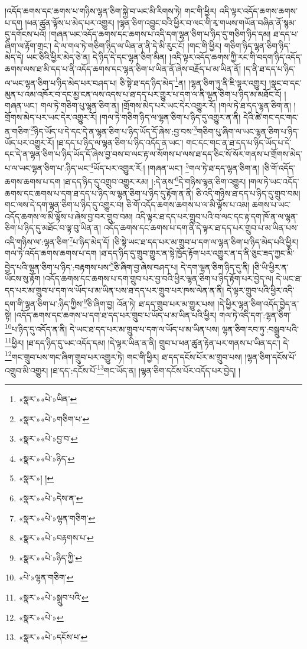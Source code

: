 །འདོད་ཆགས་དང་ཆགས་པ་གཉིས་ལྷན་ཅིག་སྐྱེ་བ་ཡང་མི་རིགས་ཏེ། གང་གི་ཕྱིར། འདི་ལྟར་འདོད་ཆགས་ཆགས་པ་དག །ཕན་ཚུན་ལྟོས་པ་མེད་པར་འགྱུར། །ལྷན་ཅིག་འབྱུང་བའི་ཕྱིར་བ་ལང་གི་རྭ་གཡས་གཡོན་བཞིན་ནོ་སྙམ་དུ་དགོངས་པའོ། །གཞན་ཡང་འདོད་ཆགས་དང་ཆགས་པ་འདི་དག་ལྷན་ཅིག་པ་ཉིད་དུ་གཅིག་ཉིད་དམ། ཐ་དད་པ་ཞིག་ལ་རྟོག་གྲང་། དེ་ལ་གལ་ཏེ་གཅིག་ཉིད་ལ་ཡིན་ན་ནི་དེ་མི་རུང་ངོ། །གང་གི་ཕྱིར། གཅིག་ཉིད་ལྷན་ཅིག་ཉིད་མེད་དེ། ཡང་ཅིའི་ཕྱིར་མེད་ཅེ་ན། དེ་ཉིད་དེ་དང་ལྷན་ཅིག་མིན། །འདི་ལྟར་འདོད་ཆགས་ཀྱི་རང་གི་བདག་ཉིད་འདོད་ཆགས་ལས་ཐ་མི་དད་པ་ནི་འདོད་ཆགས་དང་ལྷན་ཅིག་པ་ཡིན་ནོ་ཞེས་བརྗོད་པ་མ་ཡིན་ནོ། །ད་ནི་ཐ་དད་པ་ཉིད་ལ་ཡང་ལྷན་ཅིག་པ་ཉིད་མེད་པར་བཤད་པ། ཅི་སྟེ་ཐ་དད་ཉིད་མེད་\footnote{«སྣར་»«པེ་»ཡིན་}ན། །ལྷན་ཅིག་ཏུ་ནི་ཇི་ལྟར་འགྱུར། །སྣང་བ་དང་མུན་པ་འམ་འཁོར་བ་དང་མྱ་ངན་ལས་འདས་པ་ཐ་དད་པར་གྱུར་པ་དག་ལ་ནི་ལྷན་ཅིག་པ་ཉིད་མ་མཐོང་ངོ། །གཞན་ཡང་། གལ་ཏེ་གཅིག་པུ་ལྷན་ཅིག་ན། །གྲོགས་མེད་པར་ཡང་དེར་འགྱུར་རོ། །གལ་ཏེ་ཐ་དད་ལྷན་ཅིག་ན། །གྲོགས་མེད་པར་ཡང་དེར་འགྱུར་རོ། །གལ་ཏེ་གཅིག་ཉིད་ལ་ལྷན་ཅིག་པ་ཉིད་དུ་འགྱུར་ན་ནི། དེའི་ཚེ་གང་དང་གང་ན་གཅིག་\footnote{«སྣར་»«པེ་»གཅིག་པ་}ཉིད་ཡོད་པ་དེ་དང་དེ་ན་ལྷན་ཅིག་པ་ཉིད་ཡོད་དོ་ཞེས་:བྱ་བས་\footnote{«སྣར་»«པེ་»བྱ་བ་}གཅིག་པུ་ཞིག་ལ་ཡང་ལྷན་ཅིག་པ་ཉིད་ཡོད་པར་འགྱུར་རོ། །ཐ་དད་པ་ཉིད་ལ་ལྷན་ཅིག་པ་ཉིད་འདོད་ན་ཡང་། གང་དང་གང་ན་ཐ་དད་པ་ཉིད་ཡོད་པ་དེ་དང་དེ་ན་ལྷན་ཅིག་པ་ཉིད་ཡོད་དོ་ཞེས་བྱ་བས་བ་ལང་རྟ་ལ་སོགས་པ་ལས་ཐ་དད་ཅིང་སོ་སོར་གནས་པ་གྲོགས་མེད་པ་ལ་ཡང་ལྷན་ཅིག་པ་:ཉིད་ཡང་\footnote{«སྣར་»«པེ་»ཉིད་}ཡོད་པར་འགྱུར་རོ:། །གཞན་ཡང་། \footnote{«སྣར་»། ། }གལ་ཏེ་ཐ་དད་ལྷན་ཅིག་ན། །ཅི་གོ་འདོད་ཆགས་ཆགས་པ་དག །ཐ་དད་ཉིད་དུ་འགྲུབ་འགྱུར་རམ། །:དེ་ནས་\footnote{«སྣར་»«པེ་»དེས་ན་}དེ་གཉིས་ལྷན་ཅིག་འགྱུར། །གལ་ཏེ་ཡང་འདོད་ཆགས་དང་ཆགས་པ་དག་ཐ་དད་པ་ཉིད་ལ་ལྷན་ཅིག་པ་ཉིད་དུ་རྟོག་ན་ནི། ཅི་འདི་གཉིས་ཐ་དད་པ་ཉིད་དུ་གྲུབ་བམ། གང་ལས་དེ་དག་ལྷན་ཅིག་པ་ཉིད་དུ་འགྱུར་བ། ཅི་གོ་འདོད་ཆགས་ཆགས་པ་ལ་མི་ལྟོས་པ་འམ། ཆགས་པ་ཡང་འདོད་ཆགས་ལ་མི་ལྟོས་པ་ཞེས་བྱ་བར་གྲུབ་བམ། འདི་ལྟར་ཐ་དད་པར་གྲུབ་པའི་བ་ལང་དང་རྟ་དག་ཁོ་ན་ལ་ལྷན་ཅིག་པ་ཉིད་དུ་མཐོང་བ་ལྟ་བུ་ཡིན་ན། འདོད་ཆགས་དང་ཆགས་པ་དག་ནི་དེ་ལྟར་ཐ་དད་པར་གྲུབ་པ་མ་ཡིན་པས་འདི་གཉིས་ལ་:ལྷན་ཅིག་\footnote{«སྣར་»«པེ་»ལྷན་གཅིག་}པ་ཉིད་མེད་དོ། །ཅི་སྟེ་ཡང་ཐ་དད་པར་མ་གྲུབ་པ་དག་ལ་ལྷན་ཅིག་པ་ཉིད་མེད་པའི་ཕྱིར། གལ་ཏེ་འདོད་ཆགས་ཆགས་པ་དག །ཐ་དད་ཉིད་དུ་གྲུབ་གྱུར་ན་སྟེ་ཁྱོད་རྟོག་པར་འགྱུར་ན་ད་ནི་ཅུང་ཟད་ཀྱང་མི་བྱེད་པའི་ལྷན་ཅིག་པ་ཉིད་:བརྟགས་པས་\footnote{«སྣར་»«པེ་»བརྟགས་པ་}ཅི་ཞིག་བྱ་ཞེས་བཤད་པ། དེ་དག་ལྷན་ཅིག་ཉིད་དུ་ནི། །ཅི་ཡི་ཕྱིར་ན་ཡོངས་སུ་རྟོག །འདོད་ཆགས་དང་ཆགས་པ་དག་གྲུབ་པར་བྱ་བའི་ཕྱིར་ལྷན་ཅིག་པ་ཉིད་རྟོག་པར་བྱེད་ལ། དེ་ཡང་ཐ་དད་པར་མ་གྲུབ་པ་དག་ལ་ཡོད་པ་མ་ཡིན་པས་ཐ་དད་པར་གྲུབ་པར་ཁས་ལེན་ན་ནི། དེ་ལྟར་གྲུབ་པའི་ཕྱིར་འདི་དག་གི་ལྷན་ཅིག་པ་:ཉིད་ཀྱིས་\footnote{«སྣར་»«པེ་»ཉིད་ཀྱི་}ཅི་ཞིག་བྱ། འོན་ཏེ། ཐ་དད་གྲུབ་པར་མ་གྱུར་པས། །དེ་ཕྱིར་ལྷན་ཅིག་འདོད་བྱེད་ན་སྟེ། །འདོད་ཆགས་དང་ཆགས་པ་དག་ཐ་དད་པར་གྲུབ་པ་ཡོད་པ་མ་ཡིན་པའི་ཕྱིར། གལ་ཏེ་འདི་དག་:ལྷན་ཅིག་\footnote{«པེ་»ལྷན་གཅིག་}པ་ཉིད་དུ་འདོད་ན་ནི། དེ་ཡང་ཐ་དད་པར་མ་གྲུབ་པ་དག་ལ་ཡོད་པ་མ་ཡིན་པས། ལྷན་ཅིག་རབ་ཏུ་:བསྒྲུབ་པའི་\footnote{«སྣར་»«པེ་»སྒྲུབ་པའི་}ཕྱིར། །ཐ་དད་ཉིད་དུ་ཡང་འདོད་དམ། །དེ་ལྟར་ཡིན་ན་ནི། གྲུབ་པ་ཕན་ཚུན་རྟེན་པར་གནས་པ་ཡིན་དང་། དེ་\footnote{«སྣར་»«པེ་»}གང་གྲུབ་པས་གང་ཞིག་གྲུབ་པར་འགྱུར་ཏེ། གང་གི་ཕྱིར། ཐ་དད་དངོས་པོར་མ་གྲུབ་པས། །ལྷན་ཅིག་དངོས་པོ་འགྲུབ་མི་འགྱུར། །ཐ་དད་:དངོས་པོ་\footnote{«སྣར་»«པེ་»དངོས་པ་}གང་ཡོད་ན། །ལྷན་ཅིག་དངོས་པོར་འདོད་པར་བྱེད། །
